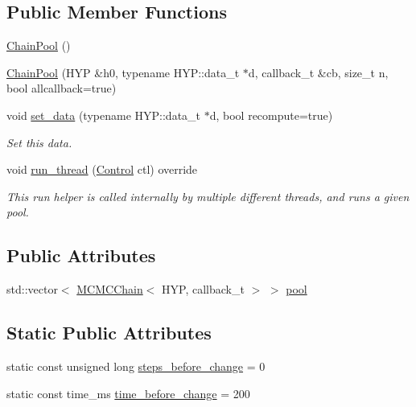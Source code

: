 \subsection*{Public Member Functions}
\begin{DoxyCompactItemize}
\item 
\hyperlink{class_chain_pool_ae8795a9a7c0fff45c82334fa821c8c3c}{Chain\+Pool} ()
\item 
\hyperlink{class_chain_pool_a7794efde5588ecbf3603170d6226cd6f}{Chain\+Pool} (H\+YP \&h0, typename H\+Y\+P\+::data\+\_\+t $\ast$d, callback\+\_\+t \&cb, size\+\_\+t n, bool allcallback=true)
\item 
void \hyperlink{class_chain_pool_af64237977e8608113092e5c1ea1ff965}{set\+\_\+data} (typename H\+Y\+P\+::data\+\_\+t $\ast$d, bool recompute=true)
\begin{DoxyCompactList}\small\item\em Set this data. \end{DoxyCompactList}\item 
void \hyperlink{class_chain_pool_a0943aa34e6c0931611d552e686fbcb4b}{run\+\_\+thread} (\hyperlink{struct_control}{Control} ctl) override
\begin{DoxyCompactList}\small\item\em This run helper is called internally by multiple different threads, and runs a given pool. \end{DoxyCompactList}\end{DoxyCompactItemize}
\subsection*{Public Attributes}
\begin{DoxyCompactItemize}
\item 
std\+::vector$<$ \hyperlink{class_m_c_m_c_chain}{M\+C\+M\+C\+Chain}$<$ H\+YP, callback\+\_\+t $>$ $>$ \hyperlink{class_chain_pool_af89400f6e9a2312fe2ee7873745a6e91}{pool}
\end{DoxyCompactItemize}
\subsection*{Static Public Attributes}
\begin{DoxyCompactItemize}
\item 
static const unsigned long \hyperlink{class_chain_pool_a143f3e4f9b60c03c67ffbc2db3e57d53}{steps\+\_\+before\+\_\+change} = 0
\item 
static const time\+\_\+ms \hyperlink{class_chain_pool_a1ff48aa1e09a9a31871dec05d3c0e9d3}{time\+\_\+before\+\_\+change} = 200
\end{DoxyCompactItemize}


